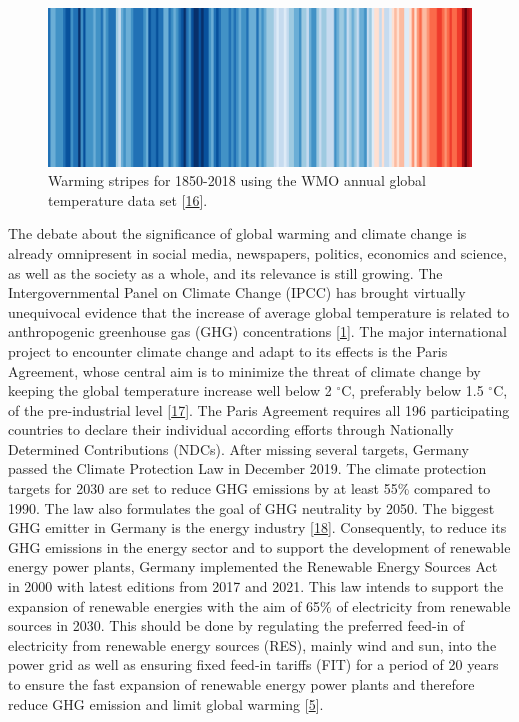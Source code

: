 \documentclass[a4paper,11pt]{article}
\begin{document}
\begin{figure}

{\centering \includegraphics[width=1\linewidth,height=0.07\textheight]{figures/wmo_stripes} 

}

\caption{Warming stripes for 1850-2018 using the WMO annual global temperature data set {[}\protect\hyperlink{ref-EdHawkins.2018}{16}{]}.}\label{fig:wmo}
\end{figure}
The debate about the significance of global warming and climate change is already omnipresent in social media, newspapers, politics, economics and science, as well as the society as a whole, and its relevance is still growing. The Intergovernmental Panel on Climate Change (IPCC) has brought virtually unequivocal evidence that the increase of average global temperature is related to anthropogenic greenhouse gas (GHG) concentrations
{[}\protect\hyperlink{ref-IntergovernmentalPanelonClimateChange.2014}{1}{]}. The major international project to encounter climate change and adapt to its effects is the Paris Agreement, whose central aim is to minimize the threat of climate
change by keeping the global temperature increase well below 2 \(^\circ\)C, preferably below 1.5 \(^\circ\)C, of the pre-industrial level {[}\protect\hyperlink{ref-UnitedNations.2015}{17}{]}. The Paris Agreement requires all 196 participating countries to declare their individual according efforts through Nationally Determined Contributions (NDCs). After missing several targets, Germany passed the Climate Protection Law in December 2019. The climate protection targets for 2030 are set to reduce GHG emissions by at least 55\% compared to 1990. The law also formulates the goal of GHG neutrality by 2050. The biggest GHG emitter in Germany is the energy industry {[}\protect\hyperlink{ref-Umweltbundesamt.2018}{18}{]}. Consequently, to reduce its GHG emissions in the energy sector and to support the development of renewable energy power plants, Germany implemented the Renewable Energy Sources Act in 2000 with latest editions from 2017 and 2021. This law intends to support the expansion of renewable energies with the aim of 65\% of electricity from renewable sources in 2030. This should be done by regulating the preferred feed-in of electricity from renewable energy sources (RES), mainly wind and sun, into the power grid as well as ensuring fixed feed-in tariffs (FIT) for a period of 20 years to ensure the fast expansion of renewable energy power plants and therefore reduce GHG emission and limit global warming {[}\protect\hyperlink{ref-BundesamtfurJustiz.2021}{5}{]}.
\end{document}
